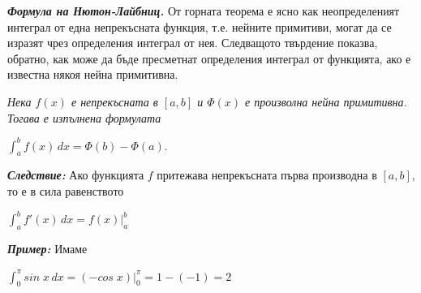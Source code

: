 \documentclass[11pt]{article} %
\newcommand{\italicBold}[1]{\textbf{\emph{#1}}}
\newcommand{\integral}[4]{\displaystyle \int_{#1}^{#2}#3\,#4}
\begin{document}
\italicBold{Формула на Нютон-Лайбниц. } От горната теорема е ясно как неопределеният интеграл от една непрекъсната функция, т.е. нейните примитиви, могат да се изразят чрез определения интеграл от нея. Следващото твърдение показва, обратно, как може да бъде пресметнат определения интеграл от функцията, ако е известна някоя нейна примитивна.\par
\textit{Нека $f(x)$ е непрекъсната в $[a,b]$ и $\Phi(x)$ е произволна нейна примитивна. Тогава е изпълнена формулата}\\
\centerline{$\integral{a}{b}{f(x)}{dx} = \Phi(b) - \Phi(a)$.}

\italicBold{Следствие: } Ако функцията $f$ притежава непрекъсната първа производна в $[a,b]$, то е в сила равенството\\
\centerline{$\integral{a}{b}{f'(x)}{dx} = f(x)\Big|_a^b$}

\italicBold{Пример: } Имаме\\
\centerline{$\integral{0}{\pi}{sin\;x}{dx}=(-cos\;x)\big|_0^\pi=1-(-1)=2$} 
  
\end{document}
